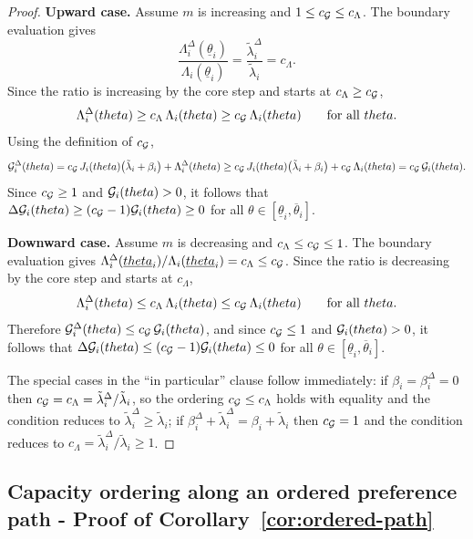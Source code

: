 \documentclass{class}
\begin{document}
\begin{proof}
\noindent\textbf{Upward case.} Assume $m$ is increasing and $1\le c_{\mathcal{G}}\le c_\Lambda$. The boundary evaluation gives
\[
\frac{\Lambda_i^\Delta(\underline\theta_i)}{\Lambda_i(\underline\theta_i)} = \frac{\tilde\lambda_i^\Delta}{\tilde\lambda_i} = c_\Lambda.
\]
Since the ratio is increasing by the core step and starts at $c_\Lambda \ge c_{\mathcal{G}}$,
\[
\Lambda_i^\Delta(theta) \ge c_\Lambda\,\Lambda_i(theta) \ge c_{\mathcal{G}}\,\Lambda_i(theta) \qquad \text{for all }theta.
\]
Using the definition of $c_{\mathcal{G}}$,
\[
\mathcal{G}_i^\Delta(theta) = c_{\mathcal{G}}\,J_i(theta)\bigl(\tilde\lambda_i+\beta_i\bigr)+\Lambda_i^\Delta(theta) \ge c_{\mathcal{G}}\,J_i(theta)\bigl(\tilde\lambda_i+\beta_i\bigr)+c_{\mathcal{G}}\,\Lambda_i(theta) = c_{\mathcal{G}}\,\mathcal{G}_i(theta).
\]
Since $c_{\mathcal{G}}\ge 1$ and $\mathcal{G}_i(theta)>0$, it follows that $\Delta\mathcal{G}_i(theta) \ge (c_{\mathcal{G}}-1)\mathcal{G}_i(theta) \ge 0$ for all $\theta\in[\underline\theta_i,\overline\theta_i]$.


\noindent\textbf{Downward case.} Assume $m$ is decreasing and $c_\Lambda\le c_{\mathcal{G}}\le 1$. The boundary evaluation gives $\Lambda_i^\Delta(\underline{theta}_i)/\Lambda_i(\underline{theta}_i) = c_\Lambda \le c_{\mathcal{G}}$. Since the ratio is decreasing by the core step and starts at $c_\Lambda$,
\[
\Lambda_i^\Delta(theta) \le c_\Lambda\,\Lambda_i(theta) \le c_{\mathcal{G}}\,\Lambda_i(theta) \qquad \text{for all }theta.
\]
Therefore $\mathcal{G}_i^\Delta(theta) \le c_{\mathcal{G}}\,\mathcal{G}_i(theta)$, and since $c_{\mathcal{G}}\le 1$ and $\mathcal{G}_i(theta)>0$, it follows that $\Delta\mathcal{G}_i(theta) \le (c_{\mathcal{G}}-1)\mathcal{G}_i(theta) \le 0$ for all $\theta\in[\underline\theta_i,\overline\theta_i]$.


The special cases in the ``in particular'' clause follow immediately: if $\beta_i=\beta_i^{\Delta}=0$ then $c_{\mathcal{G}}=c_\Lambda=\tilde\lambda_i^\Delta/\tilde\lambda_i$, so the ordering $c_{\mathcal{G}}\le c_\Lambda$ holds with equality and the condition reduces to $\tilde\lambda_i^\Delta\ge\tilde\lambda_i$; if $\beta_i^{\Delta}+\tilde\lambda_i^\Delta=\beta_i+\tilde\lambda_i$ then $c_{\mathcal{G}}=1$ and the condition reduces to $c_\Lambda=\tilde\lambda_i^\Delta/\tilde\lambda_i\ge 1$.
\qedhere
\end{proof}

\subsection{Capacity ordering along an ordered preference path - Proof of Corollary~\ref{cor:ordered-path}}\label{proof:ordered-path}
\end{document}
